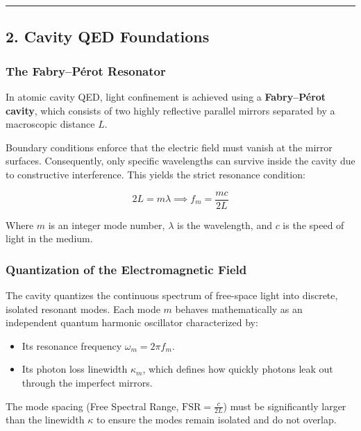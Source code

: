 \documentclass[
]{article}
\providecommand{\tightlist}{%
  \setlength{\itemsep}{0pt}\setlength{\parskip}{0pt}}
\begin{document}
\begin{center}\rule{0.5\linewidth}{0.5pt}\end{center}

\subsection{2. Cavity QED Foundations}\label{cavity-qed-foundations}

\subsubsection{The Fabry--Pérot
Resonator}\label{the-fabrypuxe9rot-resonator}

In atomic cavity QED, light confinement is achieved using a
\textbf{Fabry--Pérot cavity}, which consists of two highly reflective
parallel mirrors separated by a macroscopic distance \(L\).

Boundary conditions enforce that the electric field must vanish at the
mirror surfaces. Consequently, only specific wavelengths can survive
inside the cavity due to constructive interference. This yields the
strict resonance condition:

\[2L = m\lambda \implies f_m = \frac{m c}{2L}\]

Where \(m\) is an integer mode number, \(\lambda\) is the wavelength,
and \(c\) is the speed of light in the medium.

\subsubsection{Quantization of the Electromagnetic
Field}\label{quantization-of-the-electromagnetic-field}

The cavity quantizes the continuous spectrum of free-space light into
discrete, isolated resonant modes. Each mode \(m\) behaves
mathematically as an independent quantum harmonic oscillator
characterized by:

\begin{itemize}
\tightlist
\item
  Its resonance frequency \(\omega_m = 2\pi f_m\).
\item
  Its photon loss linewidth \(\kappa_m\), which defines how quickly
  photons leak out through the imperfect mirrors.
\end{itemize}

The mode spacing (Free Spectral Range, \(\text{FSR} = \frac{c}{2L}\))
must be significantly larger than the linewidth \(\kappa\) to ensure the
modes remain isolated and do not overlap.
\end{document}
